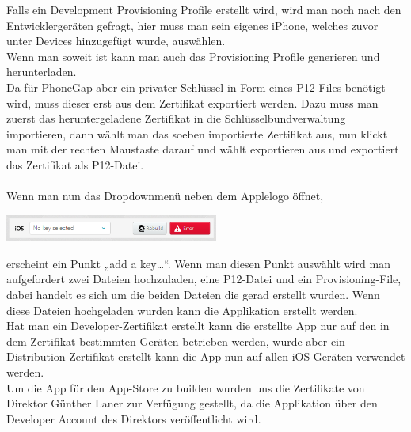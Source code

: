 Falls ein Development Provisioning Profile erstellt wird, wird man noch nach den Entwicklergeräten gefragt, hier muss man sein eigenes iPhone, welches zuvor unter Devices hinzugefügt wurde, auswählen.\\
Wenn man soweit ist kann man auch das Provisioning Profile generieren und herunterladen.\\
Da für PhoneGap aber ein privater Schlüssel in Form eines P12-Files benötigt wird, muss dieser erst aus dem Zertifikat exportiert werden. Dazu muss man zuerst das heruntergeladene Zertifikat in die Schlüsselbundverwaltung importieren, dann wählt man das soeben importierte Zertifikat aus, nun klickt man mit der rechten Maustaste darauf und wählt exportieren aus und exportiert das Zertifikat als P12-Datei.\\
\\
Wenn man nun das Dropdownmenü neben dem Applelogo öffnet,

\includegraphics[keepaspectratio=true, width=7cm]{images/phoneGap/PhoneGap4.png}

erscheint ein Punkt „add a key…“. Wenn man diesen Punkt auswählt wird man aufgefordert zwei Dateien hochzuladen, eine P12-Datei und ein Provisioning-File, dabei handelt es sich um die beiden Dateien die gerad erstellt wurden. Wenn diese Dateien hochgeladen wurden kann die Applikation erstellt werden.\\
Hat man ein Developer-Zertifikat erstellt kann die erstellte App nur auf den in dem Zertifikat bestimmten Geräten betrieben werden, wurde aber ein Distribution Zertifikat erstellt kann die App nun auf allen iOS-Geräten verwendet werden.\\
Um die App für den App-Store zu builden wurden uns die Zertifikate von Direktor Günther Laner zur Verfügung gestellt, da die Applikation über den Developer Account des Direktors veröffentlicht wird.\\

% 
%
%
% 
%
